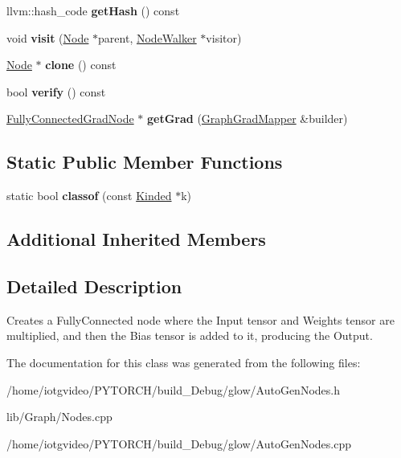 \begin{DoxyCompactItemize}
llvm\+::hash\+\_\+code {\bfseries get\+Hash} () const
\item 
\mbox{\label{classglow_1_1_fully_connected_node_a47b2af3ac56dff5e7e4a59ae77d4191d}} 
void {\bfseries visit} (\hyperlink{classglow_1_1_node}{Node} $\ast$parent, \hyperlink{classglow_1_1_node_walker}{Node\+Walker} $\ast$visitor)
\item 
\mbox{\label{classglow_1_1_fully_connected_node_a11ed7a575b947266eef1daa6b091fbb5}} 
\hyperlink{classglow_1_1_node}{Node} $\ast$ {\bfseries clone} () const
\item 
\mbox{\label{classglow_1_1_fully_connected_node_ab3ac657d31f9129d0fa0c1c2a75c385f}} 
bool {\bfseries verify} () const
\item 
\mbox{\label{classglow_1_1_fully_connected_node_a9bf67f16c782e5cc35ebde6a0b4af6f2}} 
\hyperlink{classglow_1_1_fully_connected_grad_node}{Fully\+Connected\+Grad\+Node} $\ast$ {\bfseries get\+Grad} (\hyperlink{classglow_1_1_graph_grad_mapper}{Graph\+Grad\+Mapper} \&builder)
\end{DoxyCompactItemize}
\subsection*{Static Public Member Functions}
\begin{DoxyCompactItemize}
\item 
\mbox{\label{classglow_1_1_fully_connected_node_ae990afb2a0e5338a2ad4a1722c57c50a}} 
static bool {\bfseries classof} (const \hyperlink{classglow_1_1_kinded}{Kinded} $\ast$k)
\end{DoxyCompactItemize}
\subsection*{Additional Inherited Members}


\subsection{Detailed Description}
Creates a Fully\+Connected node where the Input tensor and Weights tensor are multiplied, and then the Bias tensor is added to it, producing the Output. 

The documentation for this class was generated from the following files\+:\begin{DoxyCompactItemize}
\item 
/home/iotgvideo/\+P\+Y\+T\+O\+R\+C\+H/build\+\_\+\+Debug/glow/Auto\+Gen\+Nodes.\+h\item 
lib/\+Graph/Nodes.\+cpp\item 
/home/iotgvideo/\+P\+Y\+T\+O\+R\+C\+H/build\+\_\+\+Debug/glow/Auto\+Gen\+Nodes.\+cpp\end{DoxyCompactItemize}
